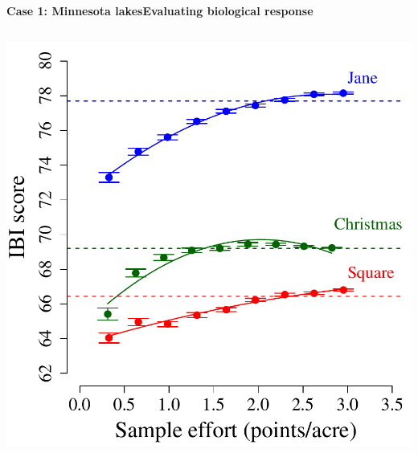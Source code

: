 \documentclass[serif]{beamer}\usepackage[]{graphicx}\usepackage[]{color}
\begin{document}
\begin{frame}{\textbf{Case 1: Minnesota lakes}}{\textbf{Evaluating biological response}}
\begin{columns}
\begin{column}{0.5\textwidth}
\begin{center}
\includegraphics[width=\textwidth]{fig/Beck_GEDsem-ibi_eff.pdf}
\end{center}
\end{column}
\end{columns}
\end{frame}
\end{document}
